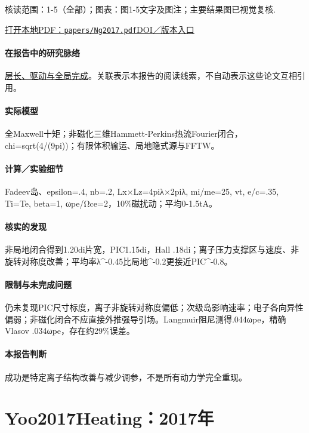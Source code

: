 \documentclass[UTF8,a4paper,11pt,openany,fontset=fandol]{ctexbook}
\begin{document}
\textsf{核读范围：}1-5（全部）；\textsf{图表：}图1-5文字及图注；主要结果图已视觉复核.

\href{run:../papers/Ng2017.pdf}{打开本地PDF：\texttt{papers/Ng2017.pdf}}\quad\href{https://doi.org/10.1063/1.4993195}{DOI／版本入口}

\paragraph{在报告中的研究脉络}\hyperref[story:global]{层长、驱动与全局完成}。关联表示本报告的阅读线索，不自动表示这些论文互相引用。

\paragraph{实际模型}全Maxwell十矩；非磁化三维Hammett-Perkins热流Fourier闭合，chi=sqrt(4/(9pi))；有限体积输运、局地隐式源与FFTW。

\paragraph{计算／实验细节}Fadeev岛、epsilon=.4, nb=.2, Lx×Lz=4piλ×2piλ, mi/me=25, vt, e/c=.35, Ti=Te, beta=1, ωpe/Ωce=2，10\%磁扰动；平均0-1.5tA。

\paragraph{核实的发现}非局地闭合得到1.20di片宽，PIC1.15di，Hall .18di；离子压力支撑区与速度、非旋转对称度改善；平均率λ\textasciicircum{}-0.45比局地\textasciicircum{}-0.2更接近PIC\textasciicircum{}-0.8。

\paragraph{限制与未完成问题}仍未复现PIC尺寸标度，离子非旋转对称度偏低；次级岛影响速率；电子各向异性偏弱；非磁化闭合不应直接外推强导引场。Langmuir阻尼测得.044ωpe，精确Vlasov .034ωpe，存在约29\%误差。

\paragraph{本报告判断}成功是特定离子结构改善与减少调参，不是所有动力学完全重现。

\section{Yoo2017Heating：2017年}\label{paper:Yoo2017Heating}
\end{document}
